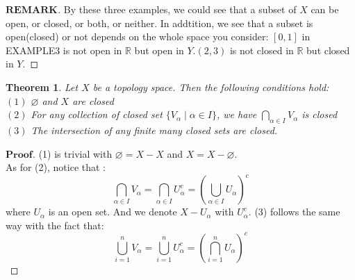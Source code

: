\documentclass[a4paper, 11pt]{article}
\newtheorem{theorem}{Theorem}
\theoremstyle{remark}
\newenvironment{myremark}
{\renewcommand\qedsymbol{$ $}\begin{proof}[$\mathbf{REMARK}$]}
  {\end{proof}}
\newenvironment{myprf}
{\renewcommand\qedsymbol{$ $}\begin{proof}[$\mathbf{Proof}$]}
  {\end{proof}}
\theoremstyle{definition}
\begin{document}
\begin{myremark}
        By these three examples, we could see that a subset of $X$ can be open, or closed,
        or both, or neither. In addtition, we see that a subset is open(closed) or not depends on
        the whole space you consider: $[0,1]$ in EXAMPLE3 is not open in $\mathbb{R}$ but
        open in $Y$.$(2,3)$ is not closed in $\mathbb{R}$ but closed in $Y$.
\end{myremark}
\begin{theorem}
        Let $X$ be a topology space. Then the following conditions hold:\\
        $\mathrm{(1)}$ $\varnothing$ and $X$ are closed\\
        $\mathrm{(2)}$ For any collection of closed set $\{V_{\alpha}\mid \alpha\in I\}$, we have
        $\displaystyle \bigcap_{\alpha\in I}V_{\alpha}$ is closed\\
        $\mathrm{(3)}$ The intersection of any finite many closed sets are closed.\\
\end{theorem}
\begin{myprf}
        (1) is trivial with $\varnothing=X-X$ and $X=X-\varnothing$.\\
        As for (2), notice that :\\
        $$
        \bigcap_{\alpha\in I}V_{\alpha}=\bigcap_{\alpha\in I}U_{\alpha}^{c}=
        (\bigcup_{\alpha\in I}U_{\alpha})^{c}
        $$ where $U_{\alpha}$ is an open set. And we denote $X-U_{\alpha}$ with 
        $U_{\alpha}^{c}$. (3) follows the same way with the fact that:
        $$\bigcup_{i=1}^{n} V_{\alpha}=\bigcup_{i=1}^{n} U_{\alpha}^{c}=
        (\bigcap_{i=1}^{n} U_{\alpha})^{c}$$
\end{myprf}
\end{document}
